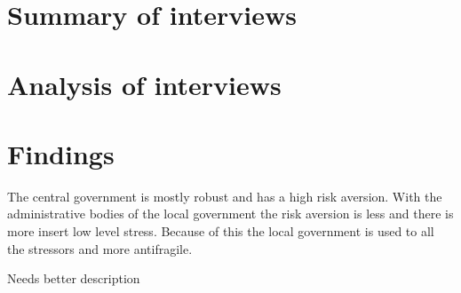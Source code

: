 \section{Summary of interviews}


\section{Analysis of interviews}

\section{Findings}

The central government is mostly robust and has a high risk aversion. With the administrative bodies of the local government the risk aversion is less and there is more insert low level stress. Because of this the local government is used to all the stressors and more antifragile.

\begin{remark}
Needs better description
\end{remark}